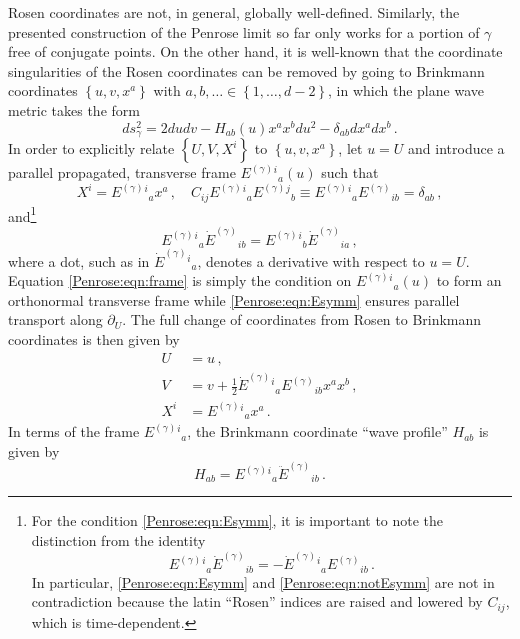 Rosen coordinates are not, in general, globally well-defined. Similarly, the presented construction of the Penrose limit so far only works for a portion of $\gamma$ free of conjugate points. On the other hand, it is well-known \cite{robinson1956report,penrose1965remarkable} that the coordinate singularities of the Rosen coordinates can be removed by going to Brinkmann coordinates $\left\lbrace u, v, x^a \right\rbrace$ with $a, b, \ldots \in \left\lbrace 1, \ldots, d-2 \right \rbrace$, in which the plane wave metric takes the form \cite{brinkmann1925einstein}
\begin{equation}\label{Penrose:eqn:Brinkmann}
ds_{\gamma}^2 = 2 du dv - H_{ab}(u)x^a x^b du^2 - \delta_{ab} dx^a dx^b  \, .
\end{equation}
In order to explicitly relate $\left\lbrace U, V, X^i \right\rbrace$ to $\left\lbrace u, v, x^a \right\rbrace$, let
$u = U$ and introduce a parallel propagated, transverse frame $E^{(\gamma)}{}^i{}_a(u)$ such that
\begin{equation}\label{Penrose:eqn:frame}
X^i = E^{(\gamma)}{}^i{}_a x^a \, , \quad  C_{ij} E^{(\gamma)}{}^i{}_a  E^{(\gamma)}{}^j{}_b \equiv E^{(\gamma)}{}^i{}_a  E^{(\gamma)}{}_{ib} = \delta_{ab}\, ,
\end{equation}
and\footnote{For the condition \eqref{Penrose:eqn:Esymm}, it is important to note the distinction from the identity
	\begin{equation}\label{Penrose:eqn:notEsymm}
	E^{(\gamma)}{}^i{}_a  \dot{E}^{(\gamma)}{}_{ib} = - \dot{E}^{(\gamma)}{}^i{}_a  E^{(\gamma)}{}_{ib}  \, .
	\end{equation}
	In particular, \eqref{Penrose:eqn:Esymm} and \eqref{Penrose:eqn:notEsymm} are not in contradiction because the latin ``Rosen'' indices are raised and lowered by $C_{ij}$, which is time-dependent.}
\begin{equation}\label{Penrose:eqn:Esymm}
E^{(\gamma)}{}^i{}_a  \dot{E}^{(\gamma)}{}_{ib} = E^{(\gamma)}{}^i{}_b  \dot{E}^{(\gamma)}{}_{ia} \, ,
\end{equation} 
where a dot, such as in $\dot{E}^{(\gamma)}{}^i{}_a$, denotes a derivative with respect to $u=U$. Equation \eqref{Penrose:eqn:frame} is simply the condition on $E^{(\gamma)}{}^i{}_a(u)$ to form an orthonormal transverse frame while \eqref{Penrose:eqn:Esymm} ensures parallel transport along $\partial_U$. The full change of coordinates from Rosen to Brinkmann coordinates is then given by
\begin{equation}\label{Penrose:eqn:RtoB}
\begin{aligned}
U &= u \, , \\
V &= v + \frac{1}{2}  \dot{E}^{(\gamma)}{}^i{}_a  E^{(\gamma)}{}_{ib} x^a x^b \, , \\
X^i &= E^{(\gamma)}{}^i{}_a x^a \, .
\end{aligned}
\end{equation}
In terms of the frame $E^{(\gamma)}{}^i{}_a$, the Brinkmann coordinate ``wave profile'' $H_{ab}$ is given by
\begin{equation}\label{Penrose:eqn:HOframe}
H_{ab}  = E^{(\gamma)}{}^i{}_a  \ddot{E}^{(\gamma)}{}_{ib} \, .
\end{equation}

